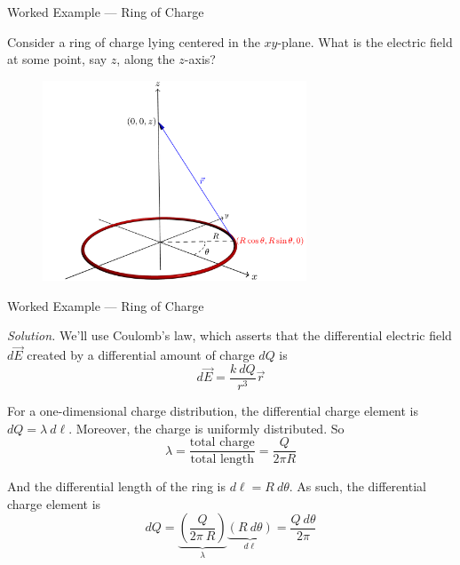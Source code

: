 \documentclass{beamer}
\begin{document}
\begin{frame}{Worked Example --- Ring of Charge}

Consider a ring of charge lying centered in the $xy$-plane. What is the electric field at some point, say $z$, along the $z$-axis?

\begin{figure}[H]
\centering
\includegraphics[width=0.7\textwidth]{figures/ring_o_charge.png}
\end{figure}

\end{frame}

\begin{frame}{Worked Example --- Ring of Charge}

\textit{Solution.} We'll use Coulomb's law, which asserts that the differential electric field $d\vec{E}$ created by a differential amount of charge $dQ$ is
\begin{equation*}
    d\vec{E} = \frac{k\ dQ}{r^3} \vec{r}
\end{equation*}

For a one-dimensional charge distribution, the differential charge element is $dQ = \lambda\ d\ell$. Moreover, the charge is uniformly distributed. So
\begin{equation*}
    \lambda = \frac{\text{total charge}}{\text{total length}} = \frac{Q}{2\pi R}
\end{equation*}

And the differential length of the ring is $d\ell = R\ d\theta$. As such, the differential charge element is
\begin{equation*}
    dQ = \underbrace{ \left( \frac{Q}{2\pi\ R} \right) }_{\lambda} \underbrace{ \left( R\ d\theta \right) }_{d\ell} = \frac{Q\ d\theta}{2\pi}
\end{equation*}

\end{frame}
\end{document}
